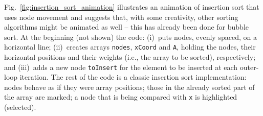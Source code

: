 

Fig.~\ref{fig:insertion_sort_animation}
illustrates an animation of insertion sort
that uses node movement and suggests that, with some creativity,
other sorting algorithms might be animated as well
-- this has already been done for bubble sort.
At the beginning (not shown) the code:
(i)~puts nodes, evenly spaced, on a horizontal line;
(ii)~creates arrays \verb$nodes$, \verb$xCoord$ and \verb$A$, holding the
nodes, their horizontal positions and their weights (i.e., the array to be sorted), respectively; and (iii)~adds a new node \verb$toInsert$ for the
element to be inserted at each outer-loop iteration.
The rest of the code is a classic insertion sort implementation: nodes behave
as if they were array positions; those in the already sorted part of the array
are marked; a node that is being compared with \verb$x$ is highlighted (selected).


